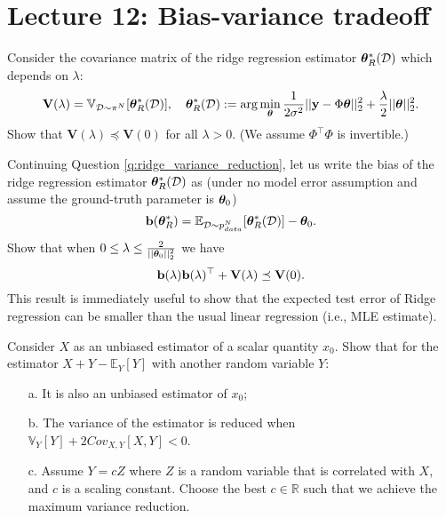\section{Lecture 12: Bias-variance tradeoff}

\newcommand{\BV}{\mathbf V}

\begin{question}
\label{q:ridge_variance_reduction}
Consider the covariance matrix of the ridge regression estimator $\bm{\theta}^*_{R}(\mathcal{D})$ which depends on $\lambda$:
$$\BV(\lambda) = \mathbb{V}_{\data \sim \pi^N}[\mparam^*_{R}(\mathcal{D})], \quad
\mparam^*_{R}(\mathcal{D}) := \arg\min_{\mparam} \frac{1}{2\sigma^2} || \y - \Phi \mparam ||_2^2 + \frac{\lambda}{2} || \mparam ||_2^2.$$
Show that $\BV(\lambda) \preceq \BV(0)$ for all $\lambda > 0$. (We assume $\Phi^\top \Phi$ is invertible.)
\end{question}

\begin{question}
\label{q:bias_variance_tradeoff_ridge_regression}
Continuing Question \ref{q:ridge_variance_reduction}, let us write the bias of the ridge regression estimator $\bm{\theta}^*_{R}(\mathcal{D})$ as (under no model error assumption and assume the ground-truth parameter is $\bm{\theta}_0$)
$$\mathbf{b}(\bm{\theta}^*_R) = \mathbb{E}_{\mathcal{D} \sim p_{data}^N}[\bm{\theta}^*_R(\mathcal{D})] - \bm{\theta}_0.$$
Show that when $0 \leq \lambda \leq \frac{2}{|| \bm{\theta}_0 ||_2^2}$ we have
$$ \Bb(\lambda) \Bb(\lambda)^\top + \BV(\lambda) \preceq \BV(0).$$
This result is immediately useful to show that the expected test error of Ridge regression can be smaller than the usual linear regression (i.e., MLE estimate).
\end{question}

\begin{question}
\label{q:control_variate}
Consider $X$ as an unbiased estimator of a scalar quantity $x_0$. Show that for the estimator $X + Y - \mathbb{E}_Y[Y]$ with another random variable $Y$:
\begin{itemize}
\item[a.] It is also an unbiased estimator of $x_0$;
\item[b.] The variance of the estimator is reduced when $\mathbb{V}_{Y}[Y] + 2 Cov_{X, Y}[X, Y] < 0$. 
\item[c.] Assume $Y = c Z$ where $Z$ is a random variable that is correlated with $X$, and $c$ is a scaling constant. Choose the best $c \in \mathbb{R}$ such that we achieve the maximum variance reduction.
\end{itemize}
\end{question}
